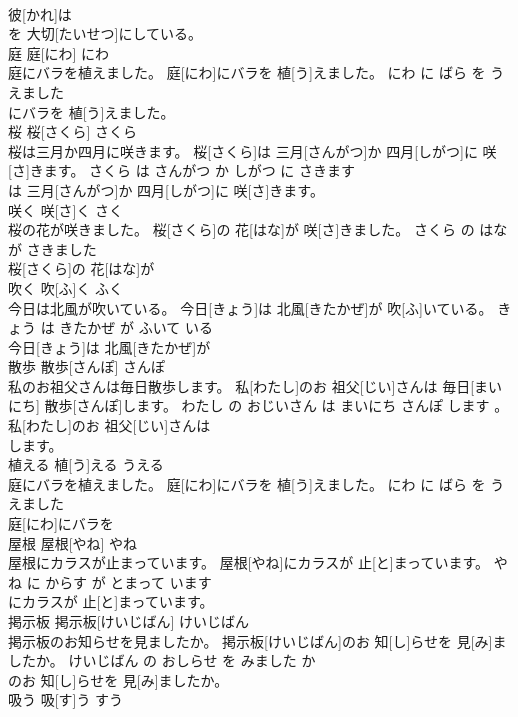\documentclass[8pt]{extreport}
\begin{document}
\begin{CJK}{UTF8}{min}
\\	彼[かれ]は
\\	を 大切[たいせつ]にしている。			
\\	庭	庭[にわ]	にわ	
\\	庭にバラを植えました。	庭[にわ]にバラを 植[う]えました。	にわ に ばら を うえました	
\\	にバラを 植[う]えました。			
\\	桜	桜[さくら]	さくら	
\\	桜は三月か四月に咲きます。	桜[さくら]は 三月[さんがつ]か 四月[しがつ]に 咲[さ]きます。	さくら は さんがつ か しがつ に さきます	
\\	は 三月[さんがつ]か 四月[しがつ]に 咲[さ]きます。			
\\	咲く	咲[さ]く	さく	
\\	桜の花が咲きました。	桜[さくら]の 花[はな]が 咲[さ]きました。	さくら の はな が さきました	
\\	桜[さくら]の 花[はな]が
\\	吹く	吹[ふ]く	ふく	
\\	今日は北風が吹いている。	今日[きょう]は 北風[きたかぜ]が 吹[ふ]いている。	きょう は きたかぜ が ふいて いる	
\\	今日[きょう]は 北風[きたかぜ]が
\\	散歩	散歩[さんぽ]	さんぽ	
\\	私のお祖父さんは毎日散歩します。	私[わたし]のお 祖父[じい]さんは 毎日[まいにち] 散歩[さんぽ]します。	わたし の おじいさん は まいにち さんぽ します 。	
\\	私[わたし]のお 祖父[じい]さんは
\\	します。			
\\	植える	植[う]える	うえる	
\\	庭にバラを植えました。	庭[にわ]にバラを 植[う]えました。	にわ に ばら を うえました	
\\	庭[にわ]にバラを
\\	屋根	屋根[やね]	やね	
\\	屋根にカラスが止まっています。	屋根[やね]にカラスが 止[と]まっています。	やね に からす が とまって います	
\\	にカラスが 止[と]まっています。			
\\	掲示板	掲示板[けいじばん]	けいじばん	
\\	掲示板のお知らせを見ましたか。	掲示板[けいじばん]のお 知[し]らせを 見[み]ましたか。	けいじばん の おしらせ を みました か	
\\	のお 知[し]らせを 見[み]ましたか。			
\\	吸う	吸[す]う	すう	

\end{CJK}
\end{document}
